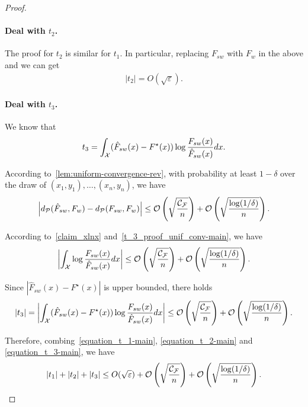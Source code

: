 \begin{proof}
\paragraph{Deal with $t_2$.}
The proof for $t_2$ is similar for $t_1$.
In particular, replacing $F_{sw}$ with $F_w$ in the above and we can get 
\begin{align} \label{equation_t_2-main}
    |t_2| = O(\sqrt{\varepsilon}).
\end{align}












\paragraph{Deal with $t_3$.}

We know that
$$t_3 = \int_{\mathcal{X}} (\hat{F}_{sw}(x)-F^\star(x))\log \frac{F_{sw}(x)}{\hat{F}_{sw}(x)} d x.$$

According to~\cref{lem:uniform-convergence-rev}, 
with probability at least $1-\delta$ over the draw of $(x_1,y_1),\dots,(x_n, y_n)$, we have
\begin{align} \label{t_3_proof_unif_conv-main}
    \left|d_{\mathcal{P}}(\hat{F}_{sw},F_w) - d_{\mathcal{P}}(F_{sw},F_w) \right| \le \mathcal{O}\left(\sqrt{\frac{\mathcal{C}_{\mathcal{F}}}{n}}\right) + \mathcal{O}\left(\sqrt{\frac{\log(1/\delta)}{n}}\right).
\end{align}

According to~\cref{claim_xlnx} and~\eqref{t_3_proof_unif_conv-main}, we have
\begin{align*}
    \left| \int_{\mathcal{X}} \log \frac{F_{sw}(x)}{\hat{F}_{sw}(x)} d x \right| \le \mathcal{O}\left(\sqrt{\frac{\mathcal{C}_{\mathcal{F}}}{n}}\right) + \mathcal{O}\left(\sqrt{\frac{\log(1/\delta)}{n}}\right).
\end{align*}

Since $|\hat{F}_{sw}(x)-F^\star(x)|$ is upper bounded, there holds
\begin{align} \label{equation_t_3-main}
    |t_3| = \left| \int_{\mathcal{X}} (\hat{F}_{sw}(x)-F^\star(x))\log \frac{F_{sw}(x)}{\hat{F}_{sw}(x)} d x \right| \le \mathcal{O}\left(\sqrt{\frac{\mathcal{C}_{\mathcal{F}}}{n}}\right) + \mathcal{O}\left(\sqrt{\frac{\log(1/\delta)}{n}}\right).
\end{align}


Therefore, combing~\eqref{equation_t_1-main}, \eqref{equation_t_2-main} and \eqref{equation_t_3-main}, we have
\begin{align} \label{t_1_2_3_ineq-main}
    |t_1| + |t_2| + |t_3| \le O(\sqrt{\varepsilon}) + \mathcal{O}\left(\sqrt{\frac{\mathcal{C}_{\mathcal{F}}}{n}}\right) + \mathcal{O}\left(\sqrt{\frac{\log(1/\delta)}{n}}\right).
\end{align}



\end{proof}
